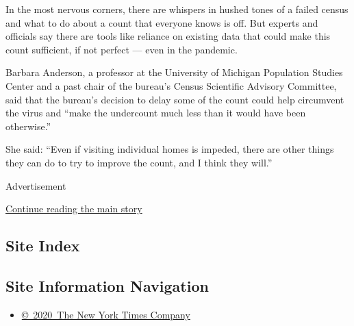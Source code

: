 In the most nervous corners, there are whispers in hushed tones of a
failed census and what to do about a count that everyone knows is off.
But experts and officials say there are tools like reliance on existing
data that could make this count sufficient, if not perfect --- even in
the pandemic.

Barbara Anderson, a professor at the University of Michigan Population
Studies Center and a past chair of the bureau's Census Scientific
Advisory Committee, said that the bureau's decision to delay some of the
count could help circumvent the virus and ``make the undercount much
less than it would have been otherwise.''

She said: ``Even if visiting individual homes is impeded, there are
other things they can do to try to improve the count, and I think they
will.''

Advertisement

\protect\hyperlink{after-bottom}{Continue reading the main story}

\hypertarget{site-index}{%
\subsection{Site Index}\label{site-index}}

\hypertarget{site-information-navigation}{%
\subsection{Site Information
Navigation}\label{site-information-navigation}}

\begin{itemize}
\tightlist
\item
  \href{https://help.nytimes3xbfgragh.onion/hc/en-us/articles/115014792127-Copyright-notice}{©~2020~The
  New York Times Company}
\end{itemize}

